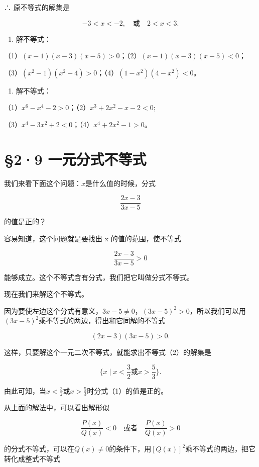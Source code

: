 ∴ 原不等式的解集是

\[
- 3 < x < - 2, \quad \text{或} \quad 2 < x < 3.
\]

\begin{enumerate}
\item
  解不等式：
\end{enumerate}

（1）\((x - 1)(x - 3)(x - 5) > 0\)；（2）\((x - 1)(x - 3)(x - 5) < 0\)；

（3）\((x^{2}-1)(x^{2}-4)>0\)；（4）\((1-x^2)(4-x^2)<0\)。

\begin{enumerate}[start=2]
\item
  解不等式：
\end{enumerate}

（1）\(x^{6}-x^{4}-2>0\)；（2）\(x^{3} + 2x^{2} - x - 2 < 0;\)

（3）\(x^{4}-3x^{2}+2<0\)；（4）\(x^{4}+2x^{2}-1>0\)。

\section{§2·9 一元分式不等式}

我们来看下面这个问题：\(x\)是什么值的时候，分式

\[
\frac{2 x - 3}{3 x - 5} \tag {1}
\]

的值是正的？

容易知道，这个问题就是要找出 x 的值的范围，使不等式

\[
\frac{2 x - 3}{3 x - 5} > 0 \tag {2}
\]

能够成立。这个不等式含有分式，我们把它叫做分式不等式。

现在我们来解这个不等式。

因为要使左边这个分式有意义，\(3x-5\neq0\)，\((3x-5)^{2}>0\)，所以我们可以用\((3x-5)^{2}\)乘不等式的两边，得出和它同解的不等式

\[
(2 x - 3) (3 x - 5) > 0. \tag {3}
\]

这样，只要解这个一元二次不等式，就能求出不等式（2）的解集是

\[
\{x \mid x < \frac{3}{2} \text{或} x > \frac{5}{3} \}.
\]

由此可知，当\(x < \frac{3}{2}\)或\(x > \frac{5}{3}\)时分式（1）的值是正的。

从上面的解法中，可以看出解形似

\[
\frac{P (x)}{Q (x)} < 0 \quad \text{或者} \quad \frac{P (x)}{Q (x)} > 0
\]

的分式不等式，可以在\(Q(x) \neq 0\)的条件下，用\([Q(x)]^2\)乘不等式的两边，把它转化成整式不等式

